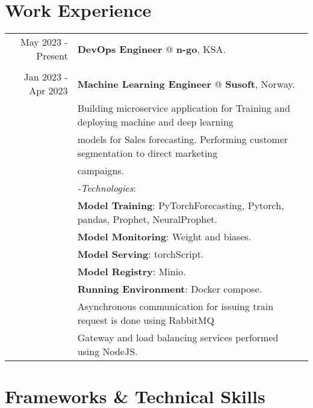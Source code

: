 \documentclass[a4paper,10pt]{article}
\begin{document}

\section{\textbf{Work Experience}}

\begin{tabular}{r|l}
    May 2023 - Present & \textbf{DevOps Engineer} @
    \textbf{n-go}, KSA. \\ 

    \\
    Jan 2023 - Apr 2023 & \textbf{Machine Learning Engineer} @
    \textbf{Susoft}, Norway. \\& 
    Building microservice application for Training and deploying machine and deep learning \\& models for Sales forecasting. 
    Performing customer segmentation to direct marketing \\& campaigns. \\&
    \textit{-Technologies}:\\&
     \textbf{Model Training}: PyTorchForecasting, Pytorch, pandas, Prophet, NeuralProphet. \\&
     \textbf{Model Monitoring}: Weight and biases.\\&
     \textbf{Model Serving}: torchScript. \\&
     \textbf{Model Registry}: Minio. \\&
     \textbf{Running Environment}: Docker compose.\\&
    Asynchronous communication for issuing train request is done using RabbitMQ \\&
    Gateway and load balancing services performed using NodeJS.
\\
\end{tabular}

\section{\textbf{Frameworks \& Technical Skills}}
\end{document}
